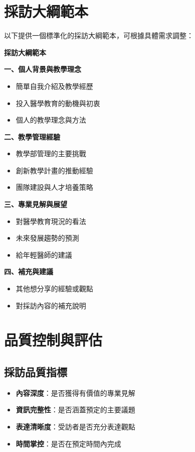 \documentclass[12pt,a4paper]{article}
\begin{document}
\section{採訪大綱範本}

以下提供一個標準化的採訪大綱範本，可根據具體需求調整：

\begin{importantbox}
\textbf{採訪大綱範本}

\textbf{一、個人背景與教學理念}
\begin{itemize}[nosep]
    \item 簡單自我介紹及教學經歷
    \item 投入醫學教育的動機與初衷
    \item 個人的教學理念與方法
\end{itemize}

\textbf{二、教學管理經驗}
\begin{itemize}[nosep]
    \item 教學部管理的主要挑戰
    \item 創新教學計畫的推動經驗
    \item 團隊建設與人才培養策略
\end{itemize}

\textbf{三、專業見解與展望}
\begin{itemize}[nosep]
    \item 對醫學教育現況的看法
    \item 未來發展趨勢的預測
    \item 給年輕醫師的建議
\end{itemize}

\textbf{四、補充與建議}
\begin{itemize}[nosep]
    \item 其他想分享的經驗或觀點
    \item 對採訪內容的補充說明
\end{itemize}
\end{importantbox}

\section{品質控制與評估}

\subsection{採訪品質指標}
\begin{itemize}[nosep]
    \item \textbf{內容深度}：是否獲得有價值的專業見解
    \item \textbf{資訊完整性}：是否涵蓋預定的主要議題
    \item \textbf{表達清晰度}：受訪者是否充分表達觀點
    \item \textbf{時間掌控}：是否在預定時間內完成
\end{itemize}
\end{document}
